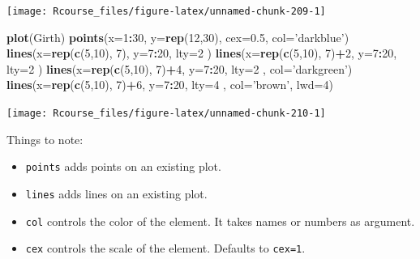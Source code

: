 \documentclass[]{book}
\newenvironment{Shaded}{\begin{snugshade}}{\end{snugshade}}
\newcommand{\KeywordTok}[1]{\textcolor[rgb]{0.13,0.29,0.53}{\textbf{#1}}}
\newcommand{\DataTypeTok}[1]{\textcolor[rgb]{0.13,0.29,0.53}{#1}}
\newcommand{\DecValTok}[1]{\textcolor[rgb]{0.00,0.00,0.81}{#1}}
\newcommand{\FloatTok}[1]{\textcolor[rgb]{0.00,0.00,0.81}{#1}}
\newcommand{\StringTok}[1]{\textcolor[rgb]{0.31,0.60,0.02}{#1}}
\newcommand{\OperatorTok}[1]{\textcolor[rgb]{0.81,0.36,0.00}{\textbf{#1}}}
\newcommand{\NormalTok}[1]{#1}
\providecommand{\tightlist}{%
  \setlength{\itemsep}{0pt}\setlength{\parskip}{0pt}}
\theoremstyle{definition}
\theoremstyle{definition}
\theoremstyle{definition}
\theoremstyle{remark}
\begin{document}
\texttt{[image: Rcourse\_files/figure-latex/unnamed-chunk-209-1]}

\begin{Shaded}
\begin{Highlighting}[]
\KeywordTok{plot}\NormalTok{(Girth)}
\KeywordTok{points}\NormalTok{(}\DataTypeTok{x=}\DecValTok{1}\OperatorTok{:}\DecValTok{30}\NormalTok{, }\DataTypeTok{y=}\KeywordTok{rep}\NormalTok{(}\DecValTok{12}\NormalTok{,}\DecValTok{30}\NormalTok{), }\DataTypeTok{cex=}\FloatTok{0.5}\NormalTok{, }\DataTypeTok{col=}\StringTok{'darkblue'}\NormalTok{)}
\KeywordTok{lines}\NormalTok{(}\DataTypeTok{x=}\KeywordTok{rep}\NormalTok{(}\KeywordTok{c}\NormalTok{(}\DecValTok{5}\NormalTok{,}\DecValTok{10}\NormalTok{), }\DecValTok{7}\NormalTok{), }\DataTypeTok{y=}\DecValTok{7}\OperatorTok{:}\DecValTok{20}\NormalTok{, }\DataTypeTok{lty=}\DecValTok{2}\NormalTok{ )}
\KeywordTok{lines}\NormalTok{(}\DataTypeTok{x=}\KeywordTok{rep}\NormalTok{(}\KeywordTok{c}\NormalTok{(}\DecValTok{5}\NormalTok{,}\DecValTok{10}\NormalTok{), }\DecValTok{7}\NormalTok{)}\OperatorTok{+}\DecValTok{2}\NormalTok{, }\DataTypeTok{y=}\DecValTok{7}\OperatorTok{:}\DecValTok{20}\NormalTok{, }\DataTypeTok{lty=}\DecValTok{2}\NormalTok{ )}
\KeywordTok{lines}\NormalTok{(}\DataTypeTok{x=}\KeywordTok{rep}\NormalTok{(}\KeywordTok{c}\NormalTok{(}\DecValTok{5}\NormalTok{,}\DecValTok{10}\NormalTok{), }\DecValTok{7}\NormalTok{)}\OperatorTok{+}\DecValTok{4}\NormalTok{, }\DataTypeTok{y=}\DecValTok{7}\OperatorTok{:}\DecValTok{20}\NormalTok{, }\DataTypeTok{lty=}\DecValTok{2}\NormalTok{ , }\DataTypeTok{col=}\StringTok{'darkgreen'}\NormalTok{)}
\KeywordTok{lines}\NormalTok{(}\DataTypeTok{x=}\KeywordTok{rep}\NormalTok{(}\KeywordTok{c}\NormalTok{(}\DecValTok{5}\NormalTok{,}\DecValTok{10}\NormalTok{), }\DecValTok{7}\NormalTok{)}\OperatorTok{+}\DecValTok{6}\NormalTok{, }\DataTypeTok{y=}\DecValTok{7}\OperatorTok{:}\DecValTok{20}\NormalTok{, }\DataTypeTok{lty=}\DecValTok{4}\NormalTok{ , }\DataTypeTok{col=}\StringTok{'brown'}\NormalTok{, }\DataTypeTok{lwd=}\DecValTok{4}\NormalTok{)}
\end{Highlighting}
\end{Shaded}

\texttt{[image: Rcourse\_files/figure-latex/unnamed-chunk-210-1]}

Things to note:

\begin{itemize}
\tightlist
\item
  \texttt{points} adds points on an existing plot.
\item
  \texttt{lines} adds lines on an existing plot.
\item
  \texttt{col} controls the color of the element. It takes names or
  numbers as argument.
\item
  \texttt{cex} controls the scale of the element. Defaults to
  \texttt{cex=1}.
\end{itemize}
\end{document}
